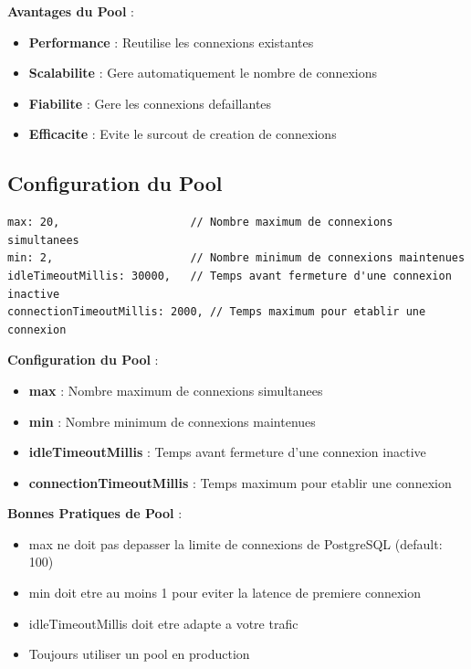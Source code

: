 \documentclass[a4paper,12pt]{book}
\begin{document}
\textbf{Avantages du Pool} :
\begin{itemize}
    \item \textbf{Performance} : Reutilise les connexions existantes
    \item \textbf{Scalabilite} : Gere automatiquement le nombre de connexions
    \item \textbf{Fiabilite} : Gere les connexions defaillantes
    \item \textbf{Efficacite} : Evite le surcout de creation de connexions
\end{itemize}

\subsection{Configuration du Pool}

\begin{lstlisting}[style=javascript]
max: 20,                    // Nombre maximum de connexions simultanees
min: 2,                     // Nombre minimum de connexions maintenues
idleTimeoutMillis: 30000,   // Temps avant fermeture d'une connexion inactive
connectionTimeoutMillis: 2000, // Temps maximum pour etablir une connexion
\end{lstlisting}

\begin{definitionbox}
    \textbf{Configuration du Pool} :
    \begin{itemize}
        \item \textbf{max} : Nombre maximum de connexions simultanees
        \item \textbf{min} : Nombre minimum de connexions maintenues
        \item \textbf{idleTimeoutMillis} : Temps avant fermeture d'une connexion inactive
        \item \textbf{connectionTimeoutMillis} : Temps maximum pour etablir une connexion
    \end{itemize}
\end{definitionbox}

\begin{bestpracticebox}
    \textbf{Bonnes Pratiques de Pool} :
    \begin{itemize}
        \item max ne doit pas depasser la limite de connexions de PostgreSQL (default: 100)
        \item min doit etre au moins 1 pour eviter la latence de premiere connexion
        \item idleTimeoutMillis doit etre adapte a votre trafic
        \item Toujours utiliser un pool en production
    \end{itemize}
\end{bestpracticebox}
\end{document}
